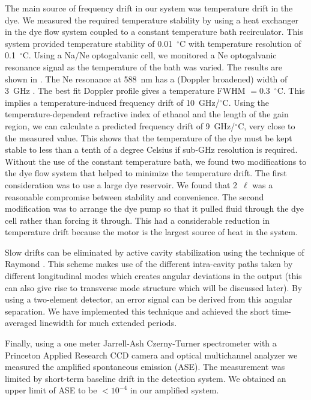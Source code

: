 The main source of frequency drift in our system was temperature drift in
the dye.  We measured the required temperature stability by using a
heat exchanger in the dye flow system coupled to a constant temperature bath
recirculator. This system provided temperature stability of 0.01~$^{\circ}$C
with temperature resolution of 0.1~$^{\circ}$C.  Using a Na/Ne optogalvanic
cell, we monitored a Ne optogalvanic resonance signal as the temperature of
the bath was varied.  The results are shown in .  The Ne resonance
at 588~nm has a (Doppler broadened) width of 3~GHz \cite{King:77}.  The best
fit Doppler profile gives a temperature FWHM $= 0.3$~$^{\circ}$C. This
implies a temperature-induced frequency drift of 10~GHz/$^{\circ}$C.  Using
the temperature-dependent refractive index of ethanol and the length of the
gain region, we can calculate a predicted frequency drift of 9~GHz/$^{\circ}$C,
very close to the measured value.  This shows that the temperature of the dye
must be kept stable to less than a tenth of a degree Celsius if sub-GHz
resolution is required.  Without the use of the constant temperature bath, we
found two modifications to the dye flow system that helped to minimize the
temperature drift.  The first consideration was to use a large dye reservoir. We
found that 2~$\ell$ was a reasonable compromise between stability and
convenience.  The second modification was to arrange the dye pump so that it
pulled fluid through the dye cell rather than forcing it through.  This had a
considerable reduction in temperature drift because the motor is the largest
source of heat in the system.

Slow drifts can be eliminated by active cavity stabilization using the
technique of Raymond \etal \cite{Raymond:89}.  This scheme makes use of
the different intra-cavity paths taken by different longitudinal modes which
creates angular deviations in the output (this can also give rise to transverse
mode structure which will be discussed later).  By using a two-element
detector, an error signal can be derived from this angular separation.  We
have implemented this technique and achieved the short time-averaged linewidth
for much extended periods.

Finally, using a one meter Jarrell-Ash Czerny-Turner spectrometer with a
Princeton Applied Research CCD camera and optical multichannel analyzer we
measured the amplified spontaneous emission (ASE).  The measurement was limited
by short-term baseline drift in the detection system.  We obtained an upper limit
of ASE to be $< 10^{-4}$ in our amplified system.

